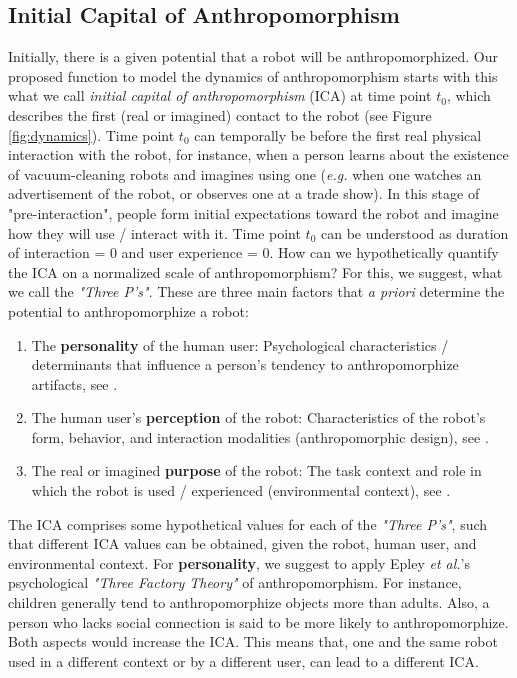 \documentclass[twocolumn]{svjour3}          %
\begin{document}
\subsection{Initial Capital of Anthropomorphism}
\label{sec:ica}

	Initially, there is a given potential that a robot will be anthropomorphized. Our proposed function to model the dynamics of anthropomorphism starts with this what we call \textit{initial capital of anthropomorphism} (ICA) at time point $t_{0}$, which describes the first (real or imagined) contact to the robot (see Figure \ref{fig:dynamics}). Time point $t_{0}$ can temporally be before the first real physical interaction with the robot, for instance, when a person learns about the existence of vacuum-cleaning robots and imagines using one (\textit{e.g.} when one watches an advertisement of the robot, or observes one at a trade show). In this stage of "pre-interaction", people form initial expectations toward the robot and imagine how they will use / interact with it. Time point $t_{0}$ can be understood as duration of interaction = 0 and user experience = 0. How can we hypothetically quantify the ICA on a normalized scale of anthropomorphism? For this, we suggest, what we call the \textit{"Three P's"}. These are three main factors that \textit{a priori} determine the potential to anthropomorphize a robot:
	
\begin{enumerate}

	\item The \textbf{personality} of the human user: Psychological characteristics / determinants that influence a person's tendency to anthropomorphize artifacts, see \cite{epley_seeing_2007}.
	
	\item The human user's \textbf{perception} of the robot: Characteristics of the robot's form, behavior, and interaction modalities (anthropomorphic design), see \cite{fong_survey_2003}.
	
	\item The real or imagined \textbf{purpose} of the robot: The task context and role in which the robot is used / experienced (environmental context), see \cite{joosse_what_2013}.

\end{enumerate}	

	The ICA comprises some hypothetical values for each of the \textit{"Three P's"}, such that different ICA values can be obtained, given the robot, human user, and environmental context.
	For \textbf{personality}, we suggest to apply Epley \textit{et al.}'s psychological \textit{"Three Factory Theory"} of anthropomorphism. For instance, children generally tend to anthropomorphize objects more than adults. Also, a person who lacks social connection is said to be more likely to anthropomorphize. Both aspects would increase the ICA. This means that, one and the same robot used in a different context or by a different user, can lead to a different ICA.
	
\end{document}
